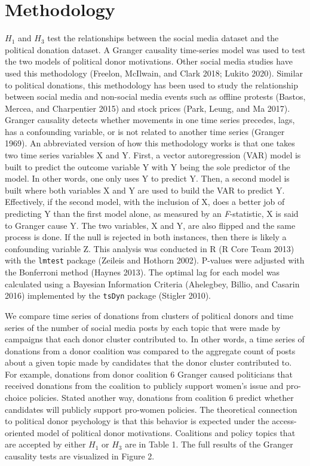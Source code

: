 \documentclass[12pt,]{article}
\begin{document}
\hypertarget{methodology}{%
\section{Methodology}\label{methodology}}

\(H_{1}\) and \(H_{3}\) test the relationships between the social media
dataset and the political donation dataset. A Granger causality
time-series model was used to test the two models of political donor
motivations. Other social media studies have used this methodology
(Freelon, McIlwain, and Clark 2018; Lukito 2020). Similar to political
donations, this methodology has been used to study the relationship
between social media and non-social media events such as offline
protests (Bastos, Mercea, and Charpentier 2015) and stock prices (Park,
Leung, and Ma 2017). Granger causality detects whether movements in one
time series precedes, lags, has a confounding variable, or is not
related to another time series (Granger 1969). An abbreviated version of
how this methodology works is that one takes two time series variables X
and Y. First, a vector autoregression (VAR) model is built to predict
the outcome variable Y with Y being the sole predictor of the model. In
other words, one only uses Y to predict Y. Then, a second model is built
where both variables X and Y are used to build the VAR to predict Y.
Effectively, if the second model, with the inclusion of X, does a better
job of predicting Y than the first model alone, as measured by an
\emph{F}-statistic, X is said to Granger cause Y. The two variables, X
and Y, are also flipped and the same process is done. If the null is
rejected in both instances, then there is likely a confounding variable
Z. This analysis was conducted in R (R Core Team 2013) with the
\texttt{lmtest} package (Zeileis and Hothorn 2002). P-values were
adjusted with the Bonferroni method (Haynes 2013). The optimal lag for
each model was calculated using a Bayesian Information Criteria
(Ahelegbey, Billio, and Casarin 2016) implemented by the \texttt{tsDyn}
package (Stigler 2010).

We compare time series of donations from clusters of political donors
and time series of the number of social media posts by each topic that
were made by campaigns that each donor cluster contributed to. In other
words, a time series of donations from a donor coalition was compared to
the aggregate count of posts about a given topic made by candidates that
the donor cluster contributed to. For example, donations from donor
coalition 6 Granger caused politicians that received donations from the
coalition to publicly support women's issue and pro-choice policies.
Stated another way, donations from coalition 6 predict whether
candidates will publicly support pro-women policies. The theoretical
connection to political donor psychology is that this behavior is
expected under the access-oriented model of political donor motivations.
Coalitions and policy topics that are accepted by either \(H_{1}\) or
\(H_{3}\) are in Table 1. The full results of the Granger causality
tests are visualized in Figure 2.
\end{document}
